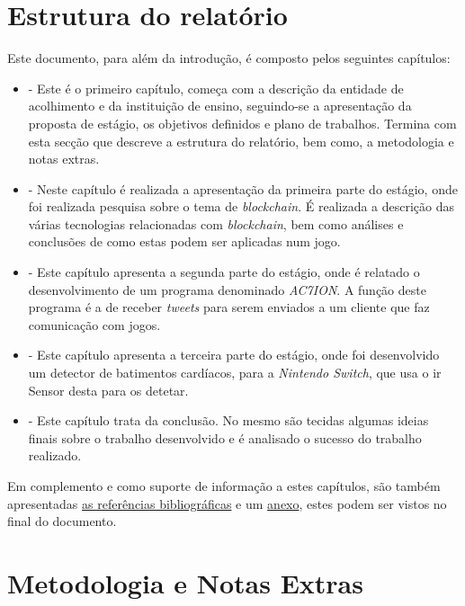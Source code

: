 \section{Estrutura do relatório}

Este documento, para além da introdução, é composto pelos seguintes capítulos:

\begin{itemize}
    \item {} - Este é o primeiro capítulo, começa com a descrição da entidade de acolhimento e da instituição de ensino, seguindo-se a apresentação da proposta de estágio, os objetivos definidos e plano de trabalhos. Termina com esta secção que descreve a estrutura do relatório, bem como, a metodologia e notas extras.
    
    \item {} - Neste capítulo é realizada a apresentação da primeira parte do estágio, onde foi realizada pesquisa sobre o tema de \textit{blockchain}. É realizada a descrição das várias tecnologias relacionadas com \textit{blockchain}, bem como análises e conclusões de como estas podem ser aplicadas num jogo.

    \item {} - Este capítulo apresenta a segunda parte do estágio, onde é relatado o desenvolvimento de um programa denominado \textit{AC7ION}. A função deste programa é a de receber \textit{tweets} para serem enviados a um cliente que faz comunicação com jogos.

    \item {} - Este capítulo apresenta a terceira parte do estágio, onde foi desenvolvido um detector de batimentos cardíacos, para a \textit{Nintendo Switch}, que usa o \acrfull{ir} Sensor desta para os detetar.

    \item {} - Este capítulo trata da conclusão. No mesmo são tecidas algumas ideias finais sobre o trabalho desenvolvido e é analisado o sucesso do trabalho realizado.
\end{itemize}

Em complemento e como suporte de informação a estes capítulos, são também apresentadas \hyperref[bibliografia]{as referências bibliográficas} e um
 \hyperref[chap:anexos]{anexo}, estes podem ser vistos no final do documento.

\section{Metodologia e Notas Extras}

